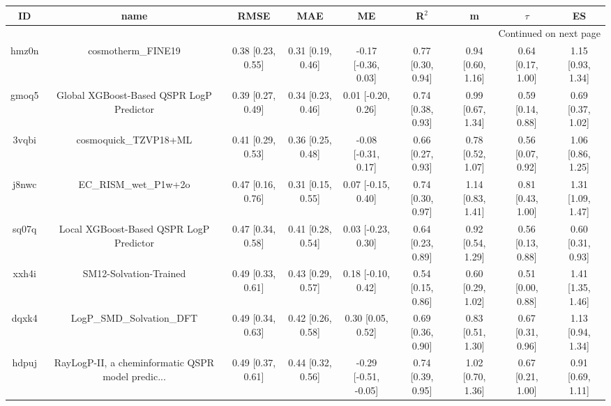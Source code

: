 \documentclass{article}
\begin{document}
\begin{center}
\scriptsize
\begin{longtable}{|ccccccccc|}
\toprule
    ID &                                               name &               RMSE &                MAE &                    ME &              R$^2$ &                    m &               $\tau$ &                    ES \\
\midrule
\endhead
\midrule
\multicolumn{9}{r}{{Continued on next page}} \\
\midrule
\endfoot

\bottomrule
\endlastfoot
 hmz0n &                                 cosmotherm\_FINE19 &  0.38 [0.23, 0.55] &  0.31 [0.19, 0.46] &   -0.17 [-0.36, 0.03] &  0.77 [0.30, 0.94] &    0.94 [0.60, 1.16] &    0.64 [0.17, 1.00] &     1.15 [0.93, 1.34] \\
 gmoq5 &           Global XGBoost-Based QSPR LogP Predictor &  0.39 [0.27, 0.49] &  0.34 [0.23, 0.46] &    0.01 [-0.20, 0.26] &  0.74 [0.38, 0.93] &    0.99 [0.67, 1.34] &    0.59 [0.14, 0.88] &     0.69 [0.37, 1.02] \\
 3vqbi &                              cosmoquick\_TZVP18+ML &  0.41 [0.29, 0.53] &  0.36 [0.25, 0.48] &   -0.08 [-0.31, 0.17] &  0.66 [0.27, 0.93] &    0.78 [0.52, 1.07] &    0.56 [0.07, 0.92] &     1.06 [0.86, 1.25] \\
 j8nwc &                              EC\_RISM\_wet\_P1w+2o &  0.47 [0.16, 0.76] &  0.31 [0.15, 0.55] &    0.07 [-0.15, 0.40] &  0.74 [0.30, 0.97] &    1.14 [0.83, 1.41] &    0.81 [0.43, 1.00] &     1.31 [1.09, 1.47] \\
 sq07q &            Local XGBoost-Based QSPR LogP Predictor &  0.47 [0.34, 0.58] &  0.41 [0.28, 0.54] &    0.03 [-0.23, 0.30] &  0.64 [0.23, 0.89] &    0.92 [0.54, 1.29] &    0.56 [0.13, 0.88] &     0.60 [0.31, 0.93] \\
 xxh4i &                             SM12-Solvation-Trained &  0.49 [0.33, 0.61] &  0.43 [0.29, 0.57] &    0.18 [-0.10, 0.42] &  0.54 [0.15, 0.86] &    0.60 [0.29, 1.02] &    0.51 [0.00, 0.88] &     1.41 [1.35, 1.46] \\
 dqxk4 &                          LogP\_SMD\_Solvation\_DFT &  0.49 [0.34, 0.63] &  0.42 [0.26, 0.58] &     0.30 [0.05, 0.52] &  0.69 [0.36, 0.90] &    0.83 [0.51, 1.30] &    0.67 [0.31, 0.96] &     1.13 [0.94, 1.34] \\
 hdpuj &  RayLogP-II, a cheminformatic QSPR model predic... &  0.49 [0.37, 0.61] &  0.44 [0.32, 0.56] &  -0.29 [-0.51, -0.05] &  0.74 [0.39, 0.95] &    1.02 [0.70, 1.36] &    0.67 [0.21, 1.00] &     0.91 [0.69, 1.11] \\

\end{longtable}
\end{center}
\end{document}
